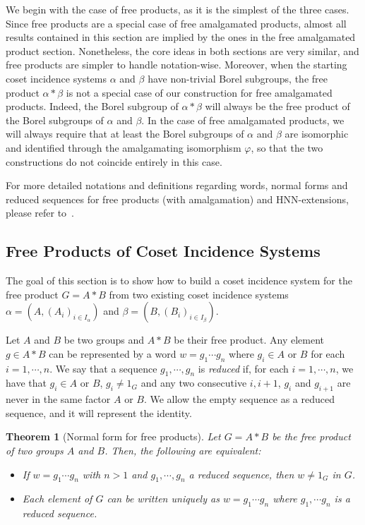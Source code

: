 \documentclass[11pt,letterpaper]{amsart}
\newtheorem{thm}[prop]{Theorem}
\begin{document}
We begin with the case of free products, as it is the simplest of the three cases. Since free products are a special case of free amalgamated products, almost all results contained in this section are implied by the ones in the free amalgamated product section. Nonetheless, the core ideas in both sections are very similar, and free products are simpler to handle notation-wise. Moreover, when the starting coset incidence systems $\alpha$ and $\beta$ have non-trivial Borel subgroups, the free product $\alpha * \beta$ is not a special case of our construction for free amalgamated products. Indeed, the Borel subgroup of $\alpha *\beta$ will always be the free product of the Borel subgroups of $\alpha$ and $\beta$. In the case of free amalgamated products, we will always require that at least the Borel subgroups of $\alpha$ and $\beta$ are isomorphic and identified through the amalgamating isomorphism $\varphi$, so that the two constructions do not coincide entirely in this case.

For more detailed notations and definitions regarding words, normal forms and reduced sequences for free products (with amalgamation) and HNN-extensions, please refer to~\cite{magnus2004combinatorial,Lyndon2001}.

\subsection{Free Products of Coset Incidence Systems}

The goal of this section is to show how to build a coset incidence system for the free product $G = A * B$ from two existing coset incidence systems $\alpha = (A, (A_i)_{i \in I_\alpha})$ and $ \beta =(B, (B_i)_{i \in I_\beta})$.

Let $A$ and $B$ be two groups and $A * B$ be their free product. Any element $g  \in A * B$ can be represented by a word $w = g_1 \cdots g_n$ where $g_i \in A$ or $B$ for each $i = 1,\cdots, n$. We say that a sequence $g_1, \cdots, g_n$ is \textit{reduced} if, for each $i = 1, \cdots, n$, we have that $g_i \in A$ or $B$, $g_i \neq 1_G$ and any two consecutive $i,i+1$, $g_i$ and $g_{i+1}$ are never in the same factor $A$ or $B$. We allow the empty sequence as a reduced sequence, and it will represent the identity.

\begin{thm}[Normal form for free products]\cite[Theorem 1.2 -- Chapter IV]{Lyndon2001}\label{thm:normal form Free}
    Let $G = A * B$ be the free product of two groups $A$ and $B$. Then, the following are equivalent:
    \begin{itemize}
        \item If $w = g_1\cdots g_n$ with $n >1$ and $g_1, \cdots, g_n$ a reduced sequence, then $w \neq 1_G$ in $G$.
        \item Each element of $G$ can be written uniquely as $w = g_1 \cdots g_n$ where $g_1, \cdots g_n$ is a reduced sequence.
    \end{itemize}
\end{thm}
\end{document}
